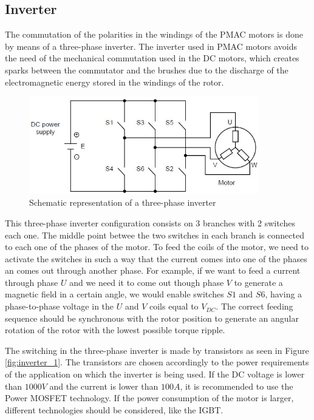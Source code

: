 \subsection{Inverter}

The commutation of the polarities in the windings of the \ac{PMAC} motors is done by means of a three-phase inverter. The inverter used in \ac{PMAC} motors avoids the need of the mechanical commutation used in the \ac{DC} motors, which creates sparks between the commutator and the brushes due to the discharge of the electromagnetic energy stored in the windings of the rotor. 

\begin{figure}[htbp]
\centering
\includegraphics[width=10cm]{Images/inverter_2.png} 
\caption[Simple Three-Phase Inverter]{Schematic representation of a three-phase inverter}
\label{fig:inverter_2}
\end{figure}

This three-phase inverter configuration consists on 3 branches with 2 switches each one. The middle point betwee the two switches in each branch is connected to each one of the phases of the motor. To feed the coils of the motor, we need to activate the switches in such a way that the current comes into one of the phases an comes out through another phase. For example, if we want to feed a current through phase $U$ and we need it to come out though phase $V$ to generate a magnetic field in a certain angle, we would enable switches $S1$ and $S6$, having a phase-to-phase voltage in the $U$ and $V$ coils equal to $V_{DC}$. The correct feeding sequence should be synchronous with the rotor position to generate an angular rotation of the rotor with the lowest possible torque ripple.

The switching in the three-phase inverter is made by transistors as seen in Figure \ref{fig:inverter_1}. The transistors are chosen accordingly to the power requirements of the application on which the inverter is being used. If the \ac{DC} voltage is lower than $1000 V$ and the current is lower than $100 A$, it is recommended to use the Power \acf{MOSFET} technology. If the power consumption of the motor is larger, different technologies should be considered, like the \acf{IGBT}.

